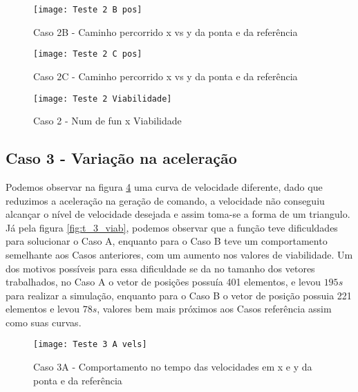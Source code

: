 \begin{figure}[H]
    \begin{center}
    \caption{Caso 2B - Caminho percorrido x vs y da ponta e da referência}
    \texttt{[image: Teste 2 B pos]}
    \label{fig:t_2b_pos}
    \end{center}
\end{figure}

\begin{figure}[H]
    \begin{center}
    \caption{Caso 2C - Caminho percorrido x vs y da ponta e da referência}
    \texttt{[image: Teste 2 C pos]}
    \label{fig:t_2c_pos}
    \end{center}
\end{figure}

\begin{figure}[H]
    \begin{center}
    \caption{Caso 2 - Num de fun x Viabilidade}
    \texttt{[image: Teste 2 Viabilidade]}
    \label{fig:t_2_viab}
    \end{center}
\end{figure}

\subsection{Caso 3 - Variação na aceleração}
Podemos observar na figura \ref{fig:t_3a_vels} uma curva de velocidade diferente, dado que reduzimos a aceleração
na geração de comando, a velocidade não conseguiu alcançar o nível de velocidade desejada e assim toma-se a forma de um triangulo.
Já pela figura \ref{fig:t_3_viab}, podemos observar que a função teve dificuldades para solucionar o Caso A, enquanto para o Caso B
teve um comportamento semelhante aos Casos anteriores, com um aumento nos valores de viabilidade.
Um dos motivos possíveis para essa dificuldade se da no tamanho dos vetores trabalhados, no Caso A o vetor de posições
possuía 401 elementos, e levou $195 s$ para realizar a simulação, enquanto para o Caso B o vetor de posição possuia 221 elementos
e levou $78 s$, valores bem mais próximos aos Casos referência assim como suas curvas.

\begin{figure}[H]
    \begin{center}
    \caption{Caso 3A - Comportamento no tempo das velocidades em x e y da ponta e da referência}
    \texttt{[image: Teste 3 A vels]}
    \label{fig:t_3a_vels}
    \end{center}
\end{figure}

